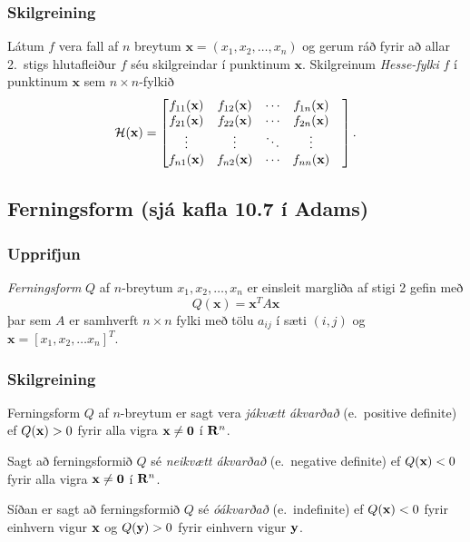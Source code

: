 \subsubsection{Skilgreining  }
Látum $f$ vera fall af $n$ breytum $\mathbf{x} = (x_1,x_2,\ldots,x_n)$ og
gerum ráð fyrir að allar 2.~stigs hlutafleiður $f$ séu skilgreindar í
punktinum $\mathbf{x}$.  Skilgreinum  {\em \color{red}Hesse-fylki} $f$ í punktinum
$\mathbf{x}$ sem $n\times n$-fylkið
$${\cal H}(\mathbf{x})=\begin{bmatrix} f_{11}(\mathbf{x})&f_{12}(\mathbf{x}) & \cdots & f_{1n}(\mathbf{x})\\
 f_{21}(\mathbf{x})&f_{22}(\mathbf{x}) & \cdots & f_{2n}(\mathbf{x}) \\
 \vdots & \vdots & \ddots & \vdots & \\
  f_{n1}(\mathbf{x})&f_{n2}(\mathbf{x}) & \cdots & f_{nn}(\mathbf{x})\end{bmatrix}.$$





\subsection{Ferningsform (sjá kafla 10.7 í Adams)} 

\subsubsection{Upprifjun  }
{\em \color{red}Ferningsform} $Q$ af $n$-breytum $x_1,x_2,\ldots, x_n$ er einsleit margliða af stigi 2 gefin með 
\begin {equation*}
Q(\mathbf{x}) = \mathbf{x}^T A \mathbf{x}
\end {equation*}
þar sem $A$ er samhverft $n \times n$ fylki með tölu $a_{ij}$ í sæti $(i,j)$ og $\mathbf{x} = [x_1,x_2,\ldots x_n]^T$.



\subsubsection{Skilgreining  }
Ferningsform $Q$ af $n$-breytum er sagt vera
{\em \color{red}jákvætt ákvarðað}  (e.~positive definite) ef $Q(\mbox{${\bf x}$})>0$ fyrir
alla vigra $\mbox{${\bf x}$}\neq \mbox{${\bf 0}$}$ í $\mbox{${\bf R}^n$}$.   

\medskip
Sagt að ferningsformið $Q$ sé
{\em \color{red}neikvætt ákvarðað} (e.~negative definite) ef $Q(\mbox{${\bf x}$})<0$ fyrir
alla vigra $\mbox{${\bf x}$}\neq \mbox{${\bf 0}$}$ í $\mbox{${\bf R}^n$}$.   

\medskip
Síðan er sagt að ferningsformið $Q$ sé
{\em  \color{red}óákvarðað}  (e.~indefinite) ef $Q(\mbox{${\bf x}$})<0$ fyrir
einhvern vigur $\mbox{${\bf x}$}$  og $Q(\mbox{${\bf y}$})>0$ fyrir einhvern vigur
$\mbox{${\bf y}$}$. 



